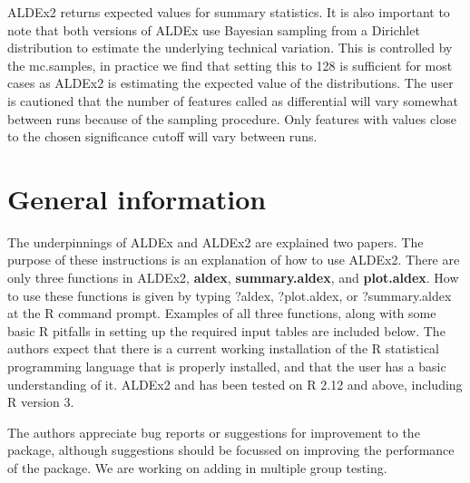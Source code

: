 \documentclass[11pt]{article}
\begin{document}
ALDEx2 returns expected values for summary statistics. It is also important to note that both versions of ALDEx use Bayesian sampling from a Dirichlet distribution to estimate  the underlying technical variation. This is controlled by the mc.samples, in practice we find that setting this to 128 is sufficient for most cases as ALDEx2 is estimating the expected value of the distributions. The user is cautioned that the number of features called as differential will vary somewhat between runs because of the sampling procedure. Only features with values close to the chosen significance cutoff will vary between runs. 

\section{General information}
The underpinnings of ALDEx and ALDEx2 are explained two papers\cite{fernandes:2013, fernandes:2014}. The purpose of these instructions is an explanation of how to use ALDEx2. There are only three functions in ALDEx2, {\bf aldex}, {\bf summary.aldex}, and {\bf plot.aldex}. How to use these functions is given by typing ?aldex, ?plot.aldex, or ?summary.aldex at the R command prompt. Examples of all three functions, along with some basic R pitfalls in setting up the required input tables are included below. The authors expect that there is a current working installation of the R statistical programming language that is properly installed, and that the user has a basic understanding of it. ALDEx2 and has been tested on R 2.12 and above, including R version 3.

The authors appreciate bug reports or suggestions for improvement to the package, although suggestions should be focussed on improving the performance of the package. We are working on adding in multiple group testing.
\end{document}
